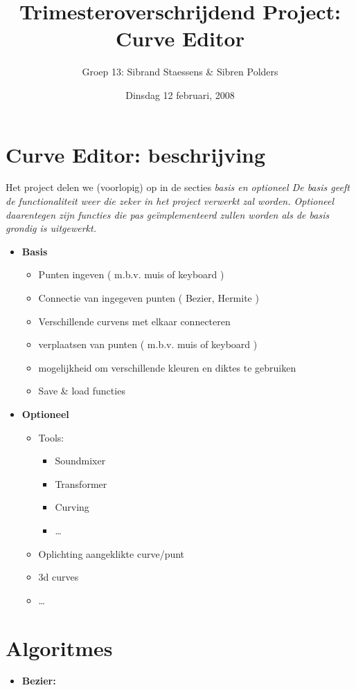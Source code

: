 \documentclass[a4paper,11pt,oneside, titlepage]{article}
\author{Groep 13: Sibrand Staessens & Sibren Polders}
\title{Trimesteroverschrijdend Project: Curve Editor}
\date{Dinsdag 12 februari, 2008}
\begin{document}
\maketitle \newpage
\section{Curve Editor: beschrijving}
Het project delen we (voorlopig) op in de secties \it{basis} en \it{optioneel}
\rm{De basis geeft de functionaliteit weer die zeker in het project verwerkt zal worden. Optioneel
daarentegen zijn functies die pas ge\"implementeerd zullen worden als de basis grondig is 
uitgewerkt.}
\begin{itemize}
\item \bf{Basis}
\begin{itemize}
\item \rm{Punten ingeven ( m.b.v. muis of keyboard )}
\item Connectie van ingegeven punten ( Bezier, Hermite )
\item Verschillende curvens met elkaar connecteren
\item verplaatsen van punten ( m.b.v. muis of keyboard )
\item mogelijkheid om verschillende kleuren en diktes te gebruiken
\item Save \& load functies
\end{itemize}
\item \bf{Optioneel}
\begin{itemize}
\item \rm{Tools:}
\begin{itemize}
\item Soundmixer
\item Transformer
\item Curving
\item \ldots
\end{itemize}
\item Oplichting aangeklikte curve/punt
\item 3d curves
\item \ldots
\end{itemize}
\end{itemize}
\section{Algoritmes}
\begin{itemize}
\item \bf{Bezier:}\newline
{}
\end{itemize}
\end{document}
